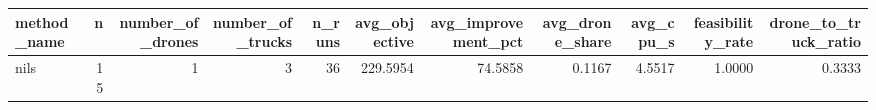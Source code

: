 \begin{tabular}{lrrrrrrrrrr}
\toprule
method_name & n & number_of_drones & number_of_trucks & n_runs & avg_objective & avg_improvement_pct & avg_drone_share & avg_cpu_s & feasibility_rate & drone_to_truck_ratio \\
\midrule
nils & 15 & 1 & 3 & 36 & 229.5954 & 74.5858 & 0.1167 & 4.5517 & 1.0000 & 0.3333 \\
\bottomrule
\end{tabular}
